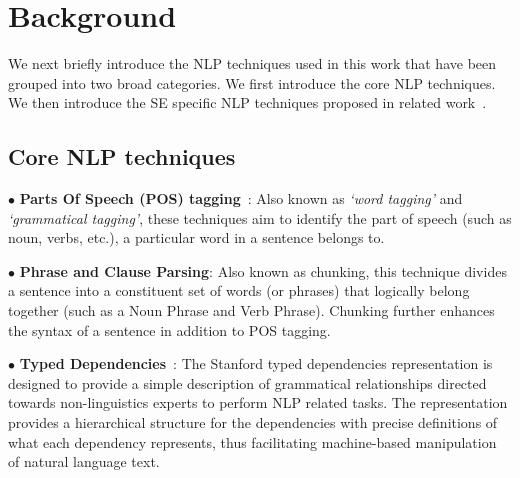 \section{Background}
\label{sec:background}

We next briefly introduce the NLP techniques used in this work that have been grouped into two broad categories.
We first introduce the core NLP techniques.
We then introduce the SE specific NLP techniques proposed in related work~\cite{pandita12:inferring,pandita13:WHYPER}.

\subsection{Core NLP techniques}
\label{sub:CoreNLPback}



{\small $\bullet$} \textbf{Parts Of Speech (POS) tagging}~\cite{Klein03,KleinNIPS03}: Also known as \textit{`word tagging'} and \textit{`grammatical tagging'}, these techniques aim to identify the part of speech (such as noun, verbs, etc.), a particular word in a sentence belongs to.

{\small $\bullet$} \textbf{Phrase and Clause Parsing}: Also known as chunking, this technique divides a sentence into a constituent set of words (or phrases) that logically belong together (such as a Noun Phrase and Verb Phrase). Chunking further enhances the syntax of a sentence in addition to POS tagging.

{\small $\bullet$} \textbf{Typed Dependencies}~\cite{Marneffe06LREC,Marneffe08COLING}: The Stanford typed dependencies representation is designed to provide a simple description of grammatical relationships directed towards non-linguistics experts to perform NLP related tasks. The representation provides a hierarchical structure for the dependencies with precise definitions of what each dependency represents, thus facilitating machine-based manipulation of natural language text.


